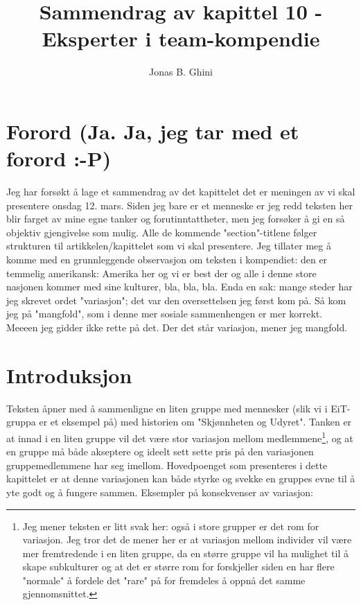 \documentclass[11pt]{article}
\title{Sammendrag av kapittel 10 - Eksperter i team-kompendie}
\author{Jonas B. Ghini}
\begin{document}
\maketitle

	\section{Forord (Ja. Ja, jeg tar med et forord :-P)}
		Jeg har forsøkt å lage et sammendrag av det kapittelet det er meningen av vi skal presentere onsdag 12. mars. Siden jeg bare er et menneske er jeg redd teksten her blir farget av mine egne tanker og forutinntattheter, men jeg forsøker å gi en så objektiv gjengivelse som mulig. Alle de kommende "section"-titlene følger strukturen til artikkelen/kapittelet som vi skal presentere. Jeg tillater meg å komme med en grunnleggende observasjon om teksten i kompendiet: den er temmelig amerikansk: Amerika her og vi er best der og alle i denne store nasjonen kommer med sine kulturer, bla, bla, bla. Enda en sak: mange steder har jeg skrevet ordet "variasjon"; det var den oversettelsen jeg først kom på. Så kom jeg på "mangfold", som i denne mer sosiale sammenhengen er mer korrekt. Meeeen jeg gidder ikke rette på det. Der det står variasjon, mener jeg mangfold.
				
	\section{Introduksjon}
		Teksten åpner med å sammenligne en liten gruppe med mennesker (slik vi i EiT-gruppa er et eksempel på) med historien om "Skjønnheten og Udyret". Tanken er at innad i en liten gruppe vil det være stor variasjon mellom medlemmene\footnote{Jeg mener teksten er litt svak her: også i store grupper er det rom for variasjon. Jeg tror det de mener her er at variasjon mellom individer vil være mer fremtredende i en liten gruppe, da en større gruppe vil ha mulighet til å skape subkulturer og at det er større rom for forskjeller siden en har flere "normale" å fordele det "rare" på for fremdeles å oppnå det samme gjennomsnittet.}, og at en gruppe må både akseptere og ideelt sett sette pris på den variasjonen gruppemedlemmene har seg imellom.
		\newline \newline
		Hovedpoenget som presenteres i dette kapittelet er at denne variasjonen kan både styrke og svekke en gruppes evne til å yte godt og å fungere sammen. Eksempler på konsekvenser av variasjon:
		
\end{document}
